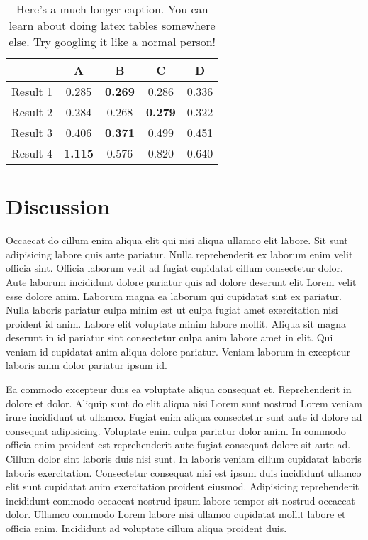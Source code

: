   \begin{table}[t!]
    \centering
    \caption[My brief table caption]{Here's a much longer caption. You can learn about doing latex tables somewhere else. Try googling it like a normal person!}
      \begin{tabular}{lcccc}
      \toprule
        & A & B & C & D \\
      \midrule
      Result 1 & 0.285 & \textbf{0.269} & 0.286 & 0.336 \\
      Result 2 & 0.284 & 0.268 & \textbf{0.279} & 0.322 \\
      Result 3 & 0.406 & \textbf{0.371} & 0.499 & 0.451 \\
      Result 4 & \textbf{1.115} & 0.576 & 0.820 & 0.640 \\
      \bottomrule
      \end{tabular}%
    \label{tab:misfit}%
  \end{table}%

\section{Discussion}
Occaecat do cillum enim aliqua elit qui nisi aliqua ullamco elit labore. Sit sunt adipisicing labore quis aute pariatur. Nulla reprehenderit ex laborum enim velit officia sint. Officia laborum velit ad fugiat cupidatat cillum consectetur dolor. Aute laborum incididunt dolore pariatur quis ad dolore deserunt elit Lorem velit esse dolore anim.
Laborum magna ea laborum qui cupidatat sint ex pariatur. Nulla laboris pariatur culpa minim est ut culpa fugiat amet exercitation nisi proident id anim. Labore elit voluptate minim labore mollit. Aliqua sit magna deserunt in id pariatur sint consectetur culpa anim labore amet in elit. Qui veniam id cupidatat anim aliqua dolore pariatur. Veniam laborum in excepteur laboris anim dolor pariatur ipsum id.

Ea commodo excepteur duis ea voluptate aliqua consequat et. Reprehenderit in dolore et dolor. Aliquip sunt do elit aliqua nisi Lorem sunt nostrud Lorem veniam irure incididunt ut ullamco. Fugiat enim aliqua consectetur sunt aute id dolore ad consequat adipisicing. Voluptate enim culpa pariatur dolor anim. In commodo officia enim proident est reprehenderit aute fugiat consequat dolore sit aute ad.
Cillum dolor sint laboris duis nisi sunt. In laboris veniam cillum cupidatat laboris laboris exercitation. Consectetur consequat nisi est ipsum duis incididunt ullamco elit sunt cupidatat anim exercitation proident eiusmod. Adipisicing reprehenderit incididunt commodo occaecat nostrud ipsum labore tempor sit nostrud occaecat dolor. Ullamco commodo Lorem labore nisi ullamco cupidatat mollit labore et officia enim. Incididunt ad voluptate cillum aliqua proident duis.

